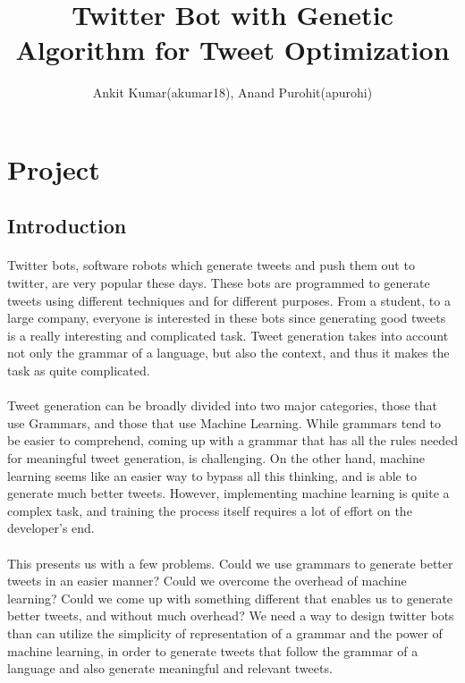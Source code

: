 \documentclass[11pt]{article}
\title{Twitter Bot with Genetic Algorithm for Tweet Optimization}
\author{Ankit Kumar(akumar18), Anand Purohit(apurohi)}
\date{}
\begin{document}
    \maketitle

    \section{Project}
        \subsection{Introduction}
        \paragraph{}
        Twitter bots, software robots which generate tweets and push them out to twitter, are very popular these days. These bots are programmed to generate tweets using different techniques and for different purposes. From a student, to a large company, everyone is interested in these bots since generating good tweets is a really interesting and complicated task. Tweet generation takes into account not only the grammar of a language, but also the context, and thus it makes the task as quite complicated.
        \paragraph{}
        Tweet generation can be broadly divided into two major categories, those that use Grammars, and those that use Machine Learning. While grammars tend to be easier to comprehend, coming up with a grammar that has all the rules needed for meaningful tweet generation, is challenging. On the other hand, machine learning seems like an easier way to bypass all this thinking, and is able to generate much better tweets. However, implementing machine learning is quite a complex task, and training the process itself requires a lot of effort on the developer's end.
        \paragraph{}
        This presents us with a few problems. Could we use grammars to generate better tweets in an easier manner? Could we overcome the overhead of machine learning? Could we come up with something different that enables us to generate better tweets, and without much overhead? We need a way to design twitter bots than can utilize the simplicity of representation of a grammar and the power of machine learning, in order to generate tweets that follow the grammar of a language and also generate meaningful and relevant tweets.
\end{document}
